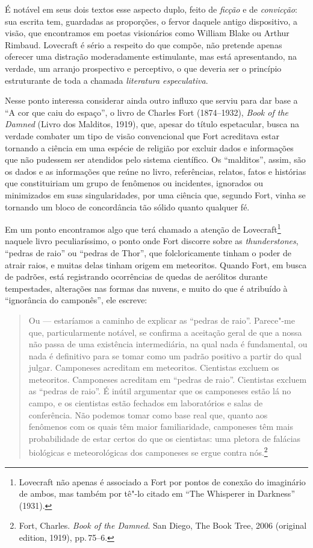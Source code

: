 É notável em seus dois textos esse aspecto duplo, feito de \emph{ficção}
e de \emph{convicção}: sua escrita tem, guardadas as proporções, o
fervor daquele antigo dispositivo, a visão, que encontramos em poetas
visionários como William Blake ou Arthur Rimbaud. Lovecraft é sério a
respeito do que compõe, não pretende apenas oferecer uma distração
moderadamente estimulante, mas está apresentando, na verdade, um arranjo
prospectivo e perceptivo, o que deveria ser o princípio estruturante de
toda a chamada \emph{literatura especulativa}.

Nesse ponto interessa considerar ainda outro influxo que serviu para dar
base a ``A cor que caiu do espaço'', o livro de Charles Fort
(1874--1932), \emph{Book of the Damned} (Livro dos Malditos, 1919), que,
apesar do título espetacular, busca na verdade combater um tipo de visão
convencional que Fort acreditava estar tornando a ciência em uma espécie
de religião por excluir dados e informações que não pudessem ser
atendidos pelo sistema científico. Os ``malditos'', assim, são os dados
e as informações que reúne no livro, referências, relatos, fatos e
histórias que constituiriam um grupo de fenômenos ou incidentes,
ignorados ou minimizados em suas singularidades, por uma ciência que,
segundo Fort, vinha se tornando um bloco de concordância tão sólido
quanto qualquer fé.

Em um ponto encontramos algo que terá chamado a atenção de
Lovecraft\footnote{Lovecraft não apenas é associado a Fort por pontos de
  conexão do imaginário de ambos, mas também por tê"-lo citado em ``The
  Whisperer in Darkness'' (1931).} naquele livro peculiaríssimo, o ponto
onde Fort discorre sobre as \emph{thunderstones}, ``pedras de raio'' ou
``pedras de Thor'', que folcloricamente tinham o poder de atrair raios,
e muitas delas tinham origem em meteoritos. Quando Fort, em busca de
padrões, está registrando ocorrências de quedas de aerólitos durante
tempestades, alterações nas formas das nuvens, e muito do que é
atribuído à ``ignorância do camponês'', ele escreve:

\begin{quote}
Ou --- estaríamos a caminho de explicar as ``pedras de raio''. Parece"-me
que, particularmente notável, se confirma a aceitação geral de que a
nossa não passa de uma existência intermediária, na qual nada é
fundamental, ou nada é definitivo para se tomar como um padrão positivo
a partir do qual julgar. Camponeses acreditam em meteoritos. Cientistas
excluem os meteoritos. Camponeses acreditam em ``pedras de raio''.
Cientistas excluem as ``pedras de raio''. É inútil argumentar que os
camponeses estão lá no campo, e os cientistas estão fechados em
laboratórios e salas de conferência. Não podemos tomar como base real
que, quanto aos fenômenos com os quais têm maior familiaridade,
camponeses têm mais probabilidade de estar certos do que os cientistas:
uma pletora de falácias biológicas e meteorológicas dos camponeses se
ergue contra nós.\footnote{Fort, Charles. \emph{Book of the Damned}. San
  Diego, The Book Tree, 2006 (original edition, 1919), pp.\,75--6.}
\end{quote}

